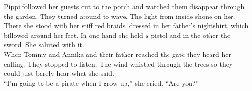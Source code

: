 \documentclass{standard}
\begin{document}
Pippi followed her guests out to the porch and watched them disappear through the garden. They turned around to wave. The light from inside shone on her. There she stood with her stiff red braids, dressed in her father’s nightshirt, which billowed around her feet. In one hand she held a pistol and in the other the sword. She saluted with it.\\

When Tommy and Annika and their father reached the gate they heard her calling. They stopped to listen. The wind whistled through the trees so they could just barely hear what she said.\\

“I’m going to be a pirate when I grow up,” she cried. “Are you?”
\end{document}
